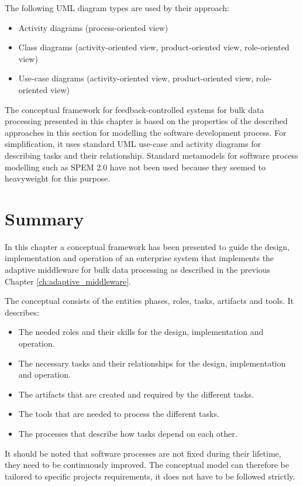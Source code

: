 The following UML diagram types are used by their approach: 
\begin{itemize}
	\item Activity diagrams (process-oriented view)
	\item Class diagrams (activity-oriented view, product-oriented view, role-oriented view)
	\item Use-case diagrams (activity-oriented view, product-oriented view, role-oriented view)
\end{itemize} 

The conceptual framework for feedback-controlled systems for bulk data processing presented in this chapter is based on the properties of the described approaches in this section for modelling the software development process. For simplification, it uses standard \ac{UML} use-case and activity diagrams for describing tasks and their relationship. Standard metamodels for software process modelling such as \ac{SPEM} 2.0 have not been used because they seemed to heavyweight for this purpose.

\section{Summary}
\label{sec:ch6_summary}
In this chapter a conceptual framework has been presented to guide the design, implementation and operation of an enterprise system that implements the adaptive middleware for bulk data processing as described in the previous Chapter \ref{ch:adaptive_middleware}.

The conceptual consists of the entities phases, roles, tasks, artifacts and tools. It describes:
\begin{itemize}
	\item The needed roles and their skills for the design, implementation and operation.
	\item The necessary tasks and their relationships for the design, implementation and operation.
	\item The artifacts that are created and required by the different tasks.
	\item The tools that are needed to process the different tasks.
	\item The processes that describe how tasks depend on each other.
\end{itemize}



It should be noted that software processes are not fixed during their lifetime, they need to be continuously improved. \citep{Fuggetta:2000ds}
The conceptual model can therefore be tailored to specific projects requirements, it does not have to be followed strictly.
